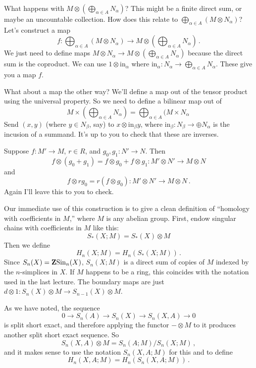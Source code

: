 \begin{property}[Sums]
What happens with $M\otimes\left(\bigoplus_{\alpha\in A}N_\alpha\right)$? This might be a finite direct sum, or maybe an uncountable collection. How does this relate to $\bigoplus_{\alpha\in A}(M\otimes N_\alpha)$? Let's construct a map 
\[
f:\bigoplus_{\alpha\in A}\left(M\otimes N_\alpha\right)\to 
M\otimes\left(\bigoplus_{\alpha\in A}N_\alpha\right)\,.
\]
We just need to define maps $M\otimes N_\alpha\to M\otimes\left(\bigoplus_{\alpha\in A}N_\alpha\right)$ because the direct sum is the coproduct. We can use $1\otimes\text{in}_\alpha$ where $\mathrm{in}_\alpha:N_\alpha\to \bigoplus_{\alpha\in A}N_\alpha$. These give you a map $f$. 

What about a map the other way? We'll define a map out of the tensor product
using the universal property. So we need to define a bilinear map out of
\[
M\times\left(\bigoplus_{\alpha\in A}N_\alpha\right)
=\bigoplus_{\alpha\in A}(M\times N_\alpha\,
\]
Send
$(x,y)$ (where $y\in N_\beta$, say) to  $x\otimes\mathrm{in}_\beta y$, where
$\mathrm{in}_\beta:N_\beta\to \oplus N_\alpha$ is the incusion of a summand. 
It's up to you to check that these are inverses.
\end{property}

\begin{property}[Distributivity] 
Suppose $f:M'\to M$, $r\in R$, and $g_0,g_1:N'\to N$. Then
\[
f\otimes(g_0+g_1)=f\otimes g_0+f\otimes g_1:M'\otimes N'\to M\otimes N
\]
and
\[
f\otimes rg_0=r(f\otimes g_0):M'\otimes N'\to M\otimes N\,.
\]
Again I'll leave this to you to check. 
\end{property}

Our immediate use of this construction is to give a clean definition of 
``homology with coefficients in $M$,'' where $M$ is any abelian group. 
First, endow singular chains with coefficients in $M$ like this:
\[
S_\ast(X;M)=S_\ast(X)\otimes M
\]
Then we define
\[
H_n(X;M)=H_n(S_\ast(X;M))\,.
\]
Since $S_n(X)=\mathbf Z\mathrm{Sin}_n(X)$, $S_n(X;M)$ is a direct sum of copies of $M$
indexed by the $n$-simplices in $X$. If $M$ happens to be a ring, this coincides 
with the notation used in the last lecture. The boundary maps are just 
$d\otimes 1:S_n(X)\otimes M\to S_{n-1}(X)\otimes M$.

As we have noted, the sequence 
\[
0\to S_n(A)\to S_n(X)\to S_n(X,A)\to0
\]
is split short exact, and therefore applying the functor $-\otimes M$ 
to it produces another split short exact sequence. So 
\[
S_n(X,A)\otimes M=S_n(A;M)/S_n(X;M)\,,
\]
and it makes sense to use the notation $S_n(X,A;M)$ for this and to  define
\[
H_n(X,A;M)=H_n(S_n(X,A;M))\,.
\]

